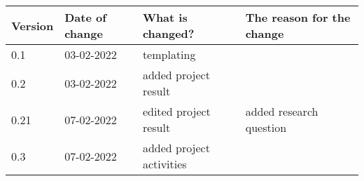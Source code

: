 \begin{tabular}{ | l | l | l | l |}
    \hline
    \textbf{Version} & \textbf{Date of change} & \textbf{What is changed?} & \textbf{The reason for the change} \\ \hline
    0.1 & 03-02-2022 & templating & \\
    0.2 & 03-02-2022 & added project result & \\
    0.21 & 07-02-2022 & edited project result & added research question\\
    0.3 & 07-02-2022 & added project activities &\\
    \hline
\end{tabular}